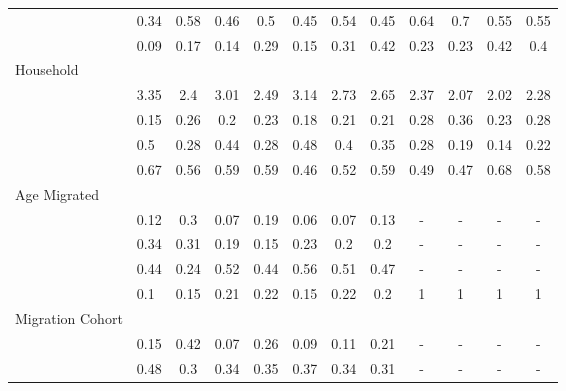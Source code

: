 \documentclass[
]{article}
\begin{document}
\begin{landscape}
\begin{table}[ht]
\begin{tabular}{>{\raggedright\arraybackslash}p{3.2cm}|lcccccc|cccc}
  \multicolumn{1}{>{\raggedleft\arraybackslash}p{2cm}|}{\makebox[2cm][r]{Secondary }}& 0.34 & 0.58 & 0.46 & 0.5 & 0.45 & 0.54 & 0.45 & 0.64 & 0.7 & 0.55 & 0.55 \\ 
  \multicolumn{1}{>{\raggedleft\arraybackslash}p{2cm}|}{\makebox[2cm][r]{University }}& 0.09 & 0.17 & 0.14 & 0.29 & 0.15 & 0.31 & 0.42 & 0.23 & 0.23 & 0.42 & 0.4 \\ 
  Household &  &  &  &  &  &  &  &  &  &  &  \\ 
  \multicolumn{1}{>{\raggedleft\arraybackslash}p{2.7cm}|}{\makebox[2.7cm][r]{Household Size }}& 3.35 & 2.4 & 3.01 & 2.49 & 3.14 & 2.73 & 2.65 & 2.37 & 2.07 & 2.02 & 2.28 \\ 
  \multicolumn{1}{>{\raggedleft\arraybackslash}p{2.2cm}|}{\makebox[2.2cm][r]{Lives Alone }}& 0.15 & 0.26 & 0.2 & 0.23 & 0.18 & 0.21 & 0.21 & 0.28 & 0.36 & 0.23 & 0.28 \\ 
  \multicolumn{1}{>{\raggedleft\arraybackslash}p{2.9cm}|}{\makebox[2.9cm][r]{Lives with Child }}& 0.5 & 0.28 & 0.44 & 0.28 & 0.48 & 0.4 & 0.35 & 0.28 & 0.19 & 0.14 & 0.22 \\ 
  \multicolumn{1}{>{\raggedleft\arraybackslash}p{3.4cm}|}{\makebox[3.4cm][r]{Married/Cohabiting }}& 0.67 & 0.56 & 0.59 & 0.59 & 0.46 & 0.52 & 0.59 & 0.49 & 0.47 & 0.68 & 0.58 \\ 
  Age Migrated &  &  &  &  &  &  &  &  &  &  &  \\ 
  \multicolumn{1}{>{\raggedleft\arraybackslash}p{2.4cm}|}{\makebox[2.4cm][r]{Less than 15 }}& 0.12 & 0.3 & 0.07 & 0.19 & 0.06 & 0.07 & 0.13 & - & - & - & - \\ 
  \multicolumn{1}{>{\raggedleft\arraybackslash}p{1.6cm}|}{\makebox[1.6cm][r]{15 - 23 }}& 0.34 & 0.31 & 0.19 & 0.15 & 0.23 & 0.2 & 0.2 & - & - & - & - \\ 
  \multicolumn{1}{>{\raggedleft\arraybackslash}p{1.6cm}|}{\makebox[1.6cm][r]{24 - 49 }}& 0.44 & 0.24 & 0.52 & 0.44 & 0.56 & 0.51 & 0.47 & - & - & - & - \\ 
  \multicolumn{1}{>{\raggedleft\arraybackslash}p{2.6cm}|}{\makebox[2.6cm][r]{50 and Above }}& 0.1 & 0.15 & 0.21 & 0.22 & 0.15 & 0.22 & 0.2 & 1 & 1 & 1 & 1 \\ 
  Migration Cohort &  &  &  &  &  &  &  &  &  &  &  \\ 
  \multicolumn{1}{>{\raggedleft\arraybackslash}p{2.3cm}|}{\makebox[2.3cm][r]{Before 1965 }}& 0.15 & 0.42 & 0.07 & 0.26 & 0.09 & 0.11 & 0.21 & - & - & - & - \\ 
  \multicolumn{1}{>{\raggedleft\arraybackslash}p{2.2cm}|}{\makebox[2.2cm][r]{1965 - 1979 }}& 0.48 & 0.3 & 0.34 & 0.35 & 0.37 & 0.34 & 0.31 & - & - & - & - \\ 

\end{tabular}
\end{table}
\end{landscape}
\end{document}
